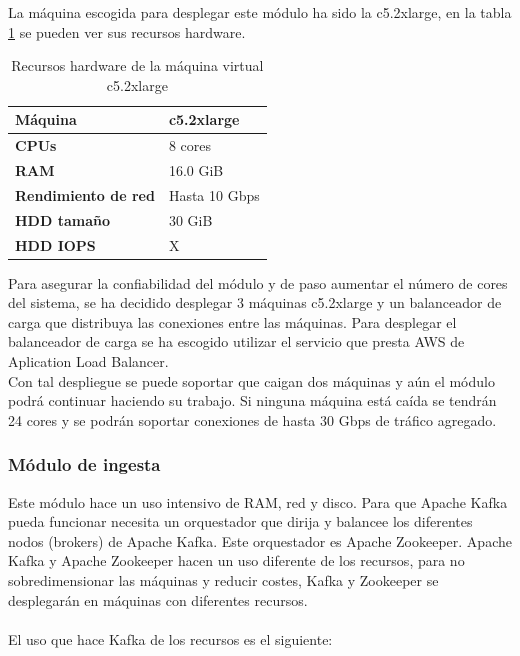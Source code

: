 La máquina escogida para desplegar este módulo ha sido la c5.2xlarge, en la tabla \ref{tabla:c5.2xlarge} se pueden ver sus recursos hardware.


\begin{table}[H]\label{tabla:c5.2xlarge}
	\centering
	\begin{tabular}{|l|l|}
		\hline
		\textbf{Máquina}            & \textbf{c5.2xlarge}    \\ \hline
		\textbf{CPUs}               & 8 cores                \\ \hline
		\textbf{RAM}                & 16.0 GiB               \\ \hline
		\textbf{Rendimiento de red} & Hasta 10 Gbps          \\ \hline
		\textbf{HDD tamaño}         & 30 GiB                 \\ \hline
		\textbf{HDD IOPS}           & X                      \\ \hline
	\end{tabular}
	\caption{Recursos hardware de la máquina virtual c5.2xlarge}
\end{table}



Para asegurar la confiabilidad del módulo y de paso aumentar el número de cores del sistema, se ha decidido desplegar 3 máquinas c5.2xlarge y un balanceador de carga que distribuya las conexiones entre las máquinas. Para desplegar el balanceador de carga se ha escogido utilizar el servicio que presta AWS de Aplication Load Balancer\cite{Tfg:apploadbalancer}.
\\
Con tal despliegue se puede soportar que caigan dos máquinas y aún el módulo podrá continuar haciendo su trabajo. Si ninguna máquina está caída se tendrán 24 cores y se podrán soportar conexiones de hasta 30 Gbps de tráfico agregado.


\subsubsection{Módulo de ingesta}
Este módulo hace un uso intensivo de RAM, red y disco. Para que Apache Kafka pueda funcionar necesita un orquestador que dirija y balancee los diferentes nodos (brokers) de Apache Kafka. Este orquestador es Apache Zookeeper. Apache Kafka y Apache Zookeeper hacen un uso diferente de los recursos, para no sobredimensionar las máquinas y reducir costes, Kafka y Zookeeper se desplegarán en máquinas con diferentes recursos.
\\\\
El uso que hace Kafka de los recursos es el siguiente:


